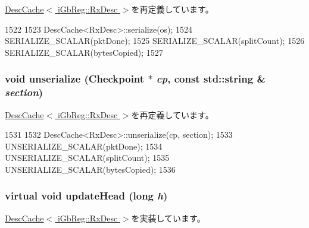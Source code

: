 \hyperlink{classIGbE_1_1DescCache_a53e036786d17361be4c7320d39c99b84}{DescCache$<$ iGbReg::RxDesc $>$}を再定義しています。


\begin{DoxyCode}
1522 {
1523     DescCache<RxDesc>::serialize(os);
1524     SERIALIZE_SCALAR(pktDone);
1525     SERIALIZE_SCALAR(splitCount);
1526     SERIALIZE_SCALAR(bytesCopied);
1527 }
\end{DoxyCode}
\hypertarget{classIGbE_1_1RxDescCache_af22e5d6d660b97db37003ac61ac4ee49}{
\subsubsection[{unserialize}]{\setlength{\rightskip}{0pt plus 5cm}void unserialize ({\bf Checkpoint} $\ast$ {\em cp}, \/  const std::string \& {\em section})}}
\label{classIGbE_1_1RxDescCache_af22e5d6d660b97db37003ac61ac4ee49}


\hyperlink{classIGbE_1_1DescCache_af22e5d6d660b97db37003ac61ac4ee49}{DescCache$<$ iGbReg::RxDesc $>$}を再定義しています。


\begin{DoxyCode}
1531 {
1532     DescCache<RxDesc>::unserialize(cp, section);
1533     UNSERIALIZE_SCALAR(pktDone);
1534     UNSERIALIZE_SCALAR(splitCount);
1535     UNSERIALIZE_SCALAR(bytesCopied);
1536 }
\end{DoxyCode}
\hypertarget{classIGbE_1_1RxDescCache_a4f8dbb4f64167626cac110753708c55c}{
\subsubsection[{updateHead}]{\setlength{\rightskip}{0pt plus 5cm}virtual void updateHead (long {\em h})}}
\label{classIGbE_1_1RxDescCache_a4f8dbb4f64167626cac110753708c55c}


\hyperlink{classIGbE_1_1DescCache_af48912789332a0283480cd85c7197f15}{DescCache$<$ iGbReg::RxDesc $>$}を実装しています。


